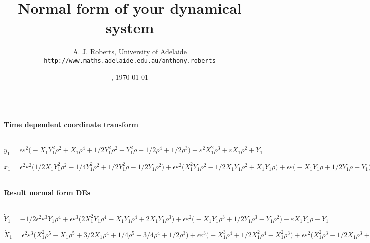 \documentclass[11pt,a5paper]{article}
\title{Normal form of your dynamical system}
\author{A. J. Roberts, University of Adelaide\\
\texttt{http://www.maths.adelaide.edu.au/anthony.roberts}}
\date{\now, \today}
\begin{document}
\maketitle


\begin{math}
\end{math}
\paragraph{Time dependent coordinate transform}
\begin{math}
\end{math}\par

\begin{math}
y_{1}=\epsilon  \varepsilon ^{2} \big(-X_{1} Y_{1}^{2} \rho ^{2}+X_{1} 
\rho ^{4}+1/2 Y_{1}^{2} \rho ^{2}-Y_{1}^{2} \rho -1/2 \rho ^{4}+1/2 
\rho ^{3}\big)-\varepsilon ^{2} X_{1}^{2} \rho ^{3}+\varepsilon  X_{1} 
\rho ^{2}+Y_{1}
\end{math}\par

\begin{math}
x_{1}=\epsilon ^{2} \varepsilon ^{2} \big(1/2 X_{1} Y_{1}^{2} \rho ^{2}-
1/4 Y_{1}^{2} \rho ^{2}+1/2 Y_{1}^{2} \rho -1/2 Y_{1} \rho ^{2}\big)+
\epsilon  \varepsilon ^{2} \big(X_{1}^{2} Y_{1} \rho ^{2}-1/2 X_{1} Y_{1
} \rho ^{2}+X_{1} Y_{1} \rho \big)+\epsilon  \varepsilon  \big(-X_{1} Y_
{1} \rho +1/2 Y_{1} \rho -Y_{1}\big)+X_{1}
\end{math}\par

\begin{math}
\end{math}
\paragraph{Result normal form DEs}
\begin{math}
\end{math}\par

\begin{math}
\dot Y_{1}=-1/2 \epsilon ^{2} \varepsilon ^{3} Y_{1} \rho ^{4}+\epsilon 
 \varepsilon ^{3} \big(2 X_{1}^{2} Y_{1} \rho ^{4}-X_{1} Y_{1} \rho ^{4}
+2 X_{1} Y_{1} \rho ^{3}\big)+\epsilon  \varepsilon ^{2} \big(-X_{1} Y_{
1} \rho ^{3}+1/2 Y_{1} \rho ^{3}-Y_{1} \rho ^{2}\big)-\varepsilon  X_{1}
 Y_{1} \rho -Y_{1}
\end{math}\par

\begin{math}
\dot X_{1}=\epsilon ^{2} \varepsilon ^{3} \big(X_{1}^{2} \rho ^{5}-X_{1}
 \rho ^{5}+3/2 X_{1} \rho ^{4}+1/4 \rho ^{5}-3/4 \rho ^{4}+1/2 \rho ^{3}
\big)+\epsilon  \varepsilon ^{3} \big(-X_{1}^{3} \rho ^{4}+1/2 X_{1}^{2}
 \rho ^{4}-X_{1}^{2} \rho ^{3}\big)+\epsilon  \varepsilon ^{2} \big(X_{1
}^{2} \rho ^{3}-1/2 X_{1} \rho ^{3}+X_{1} \rho ^{2}\big)+\epsilon  
\varepsilon  \big(-X_{1} \rho ^{2}+1/2 \rho ^{2}-1/2 \rho \big)
\end{math}\par
\end{document}
